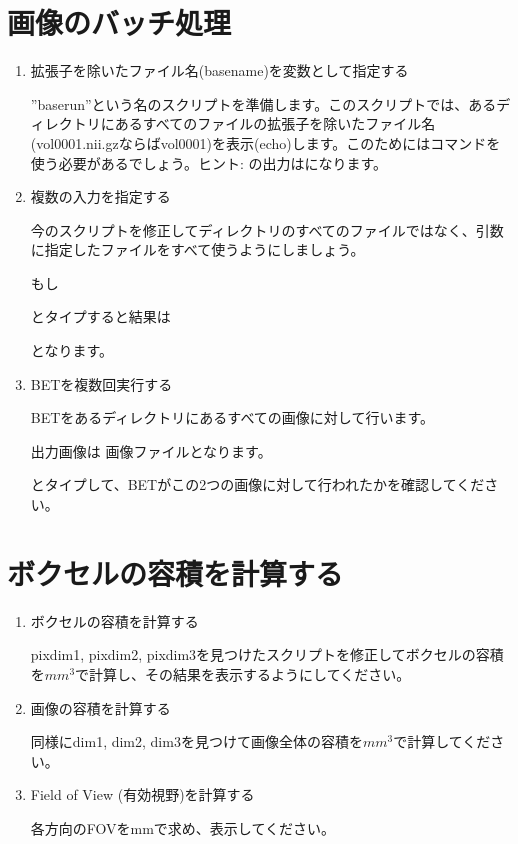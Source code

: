 \documentclass{jsarticle}
\begin{document}
\section{画像のバッチ処理}

\begin{enumerate}
\item 拡張子を除いたファイル名(basename)を変数として指定する

''baserun''という名のスクリプトを準備します。このスクリプトでは、あるディレクトリにあるすべてのファイルの拡張子を除いたファイル名(vol0001.nii.gzならばvol0001)を表示(echo)します。このためには{\color{red}}コマンドを使う必要があるでしょう。ヒント: {\color{red}}の出力は{\color{red}}になります。

\item 複数の入力を指定する

今のスクリプトを修正してディレクトリのすべてのファイルではなく、引数に指定したファイルをすべて使うようにしましょう。

もし

{\color{red}}

とタイプすると結果は

{\color{red}{\tt
im2

im3}}

となります。

\item BETを複数回実行する

BETをあるディレクトリにあるすべての画像に対して行います。

出力画像は 画像ファイル{\color{red}}となります。

{\color{red}}

とタイプして、BETがこの2つの画像に対して行われたかを確認してください。

\end{enumerate}

\section{ボクセルの容積を計算する}

\begin{enumerate}

\item ボクセルの容積を計算する

pixdim1, pixdim2, pixdim3を見つけたスクリプトを修正してボクセルの容積を$mm^3$で計算し、その結果を表示するようにしてください。

\item 画像の容積を計算する

同様にdim1, dim2, dim3を見つけて画像全体の容積を$mm^3$で計算してください。


\item Field of View (有効視野)を計算する

各方向のFOVをmmで求め、表示してください。

\end{enumerate}
\end{document}
